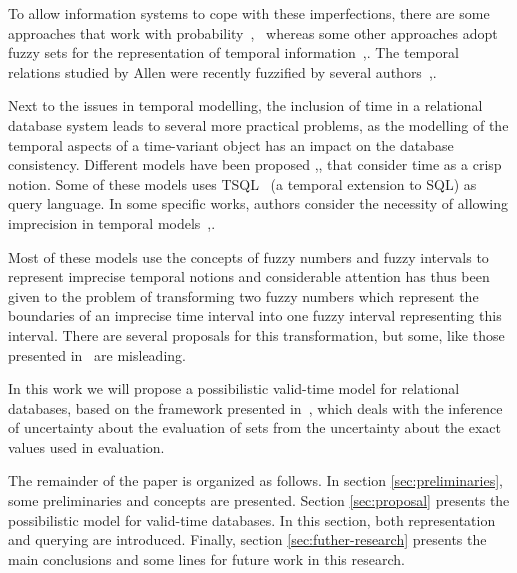 To allow information systems to cope with these imperfections, there are some approaches that work with probability~\cite{Dekhtyar2001},~\cite{Parisi2010} whereas some other approaches adopt fuzzy sets for the representation of temporal information~\cite{Billiet:Pons:Matthe:DeTre:Pons:2011:BipolarFuzzy},\cite{Dubois:jucs_9_9:fuzziness_and_uncertainty_in}. The temporal relations studied by Allen were recently fuzzified by several authors~\cite{ohlbach04},\cite{schockaert08}.


Next to the issues in temporal modelling, the inclusion of time in a relational database system leads to several more practical problems, as the modelling of the temporal aspects of a time-variant object has an impact on the database consistency. Different models have been proposed \cite{Jensen91},\cite{Snodgrass84},\cite{Nascimento95} that consider time as a crisp notion. Some of these models uses TSQL~\cite{Jensen1995} (a temporal extension to SQL) as query language. In some specific works, authors consider the necessity of allowing imprecision in temporal models~\cite{Cru97},\cite{Garrido2009}.

Most of these models use the concepts of fuzzy numbers and fuzzy intervals to represent imprecise temporal notions and considerable attention has thus been given to the problem of transforming two fuzzy numbers which represent the boundaries of an imprecise time interval into one fuzzy interval representing this interval. There are several proposals for this transformation, but some, like those presented in~\cite{Garrido2009} are misleading. 

In this work we will propose a possibilistic valid-time model for relational databases, based on the framework presented in~\cite{Pon11}, which deals with the inference of uncertainty about the evaluation of sets from the uncertainty about the exact values used in evaluation. 

The remainder of the paper is organized as follows. In section \ref{sec:preliminaries}, some preliminaries and concepts are presented. 
Section \ref{sec:proposal} presents the possibilistic model for valid-time databases. In this section, both representation and querying are introduced.
Finally, section \ref{sec:futher-research} presents the main conclusions and some lines for future work in this research.